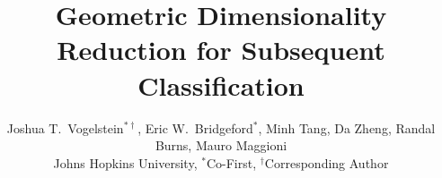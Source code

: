 \documentclass[11pt]{extarticle}
\begin{document}
\def\spacingset#1{\renewcommand{\baselinestretch}%
{#1}\small\normalsize} \spacingset{1}
\title{ %
Geometric Dimensionality Reduction for  Subsequent \\ Classification
}

\author{
Joshua T.~Vogelstein$^{*\dag}$,  
Eric W.~Bridgeford$^*$,  
Minh Tang, 
Da Zheng, %
Randal Burns, 
Mauro Maggioni
\\ Johns Hopkins University, $^*$Co-First, $^\dag$Corresponding Author}
\date{}

\maketitle
\thispagestyle{empty}
\end{document}
